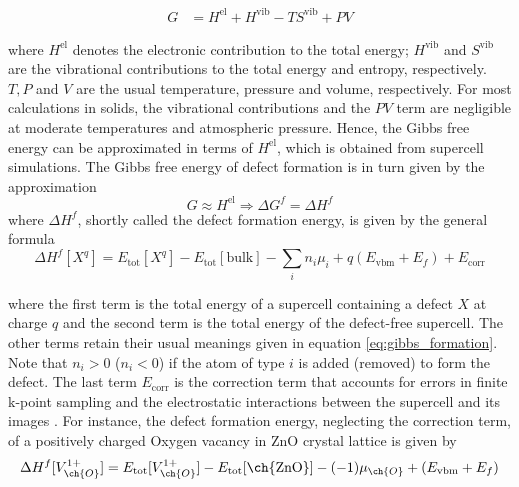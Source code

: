 \begin{align}
    G &= H^{\text{el}} + H^{\text{vib}} - TS^{\text{vib}} + PV   
\end{align}

where $H^{\text{el}}$ denotes the electronic contribution to the total energy; $H^{\text{vib}}$ and $S^{\text{vib}}$  are the vibrational contributions to the total energy and entropy, respectively. $T,P$ and $V$ are the usual temperature, pressure and volume, respectively. For most calculations in solids, the vibrational contributions and the $PV$ term are negligible at moderate temperatures and atmospheric pressure. Hence, the Gibbs free energy can be approximated in terms of   $H^{\text{el}}$, which is obtained from supercell simulations.  The Gibbs free energy of defect formation is in turn given by the approximation
\begin{equation}
    G \approx H^{\text{el}} \Longrightarrow \Delta G^f = \Delta H^f
\end{equation}
where $\Delta H^f$, shortly called the defect formation energy, is given by the general formula \citep{Freysoldt2014}
\begin{equation} \label{eq:formation_E}
    \Delta H^f [X^q] = E_{\text{tot}}[X^q] - E_{\text{tot}}[\text{bulk}] -  \sum_i n_i \mu_i + q (E_{\text{vbm}} + E_f) + E_{\text{corr}}
\end{equation}

where the first  term is  the total energy  of a supercell containing a defect $X$ at charge $q$ and the  second term is the total energy of the defect-free supercell. The other terms retain their usual meanings given in equation \eqref{eq:gibbs_formation}. Note that $n_i > 0$ ($n_i < 0$) if the atom of type $i$ is added (removed) to form the defect. The last term $E_{\text{corr}}$ is the correction term that accounts for errors in finite k-point sampling and the electrostatic interactions between the supercell and its images \citep{Leslie1985,Makov1995,Dabo2008}. For instance, the defect formation energy, neglecting the correction term, of a positively charged Oxygen vacancy in ZnO crystal lattice is given by 
\begin{equation}
    \Delta H^f [V^{1+}_{\ch{O}}] = E_{\text{tot}}[V^{1+}_{\ch{O}}] - E_{\text{tot}}[\text{\ch{ZnO}}] - (-1) \mu_{\ch{O}} + (E_{\text{vbm}} + E_f)
\end{equation}

